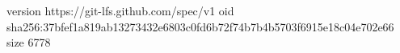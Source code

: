 version https://git-lfs.github.com/spec/v1
oid sha256:37bfef1a819ab13273432e6803c0fd6b72f74b7b4b5703f6915e18c04e702e66
size 6778
